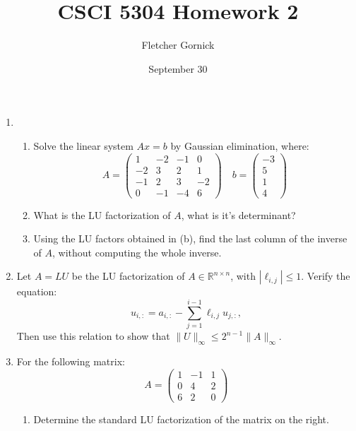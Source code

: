 \documentclass[11pt]{article}
\title{\vspace{-1.0cm}CSCI 5304 Homework 2 }
\author{Fletcher Gornick}
\date{September 30}
\newcommand{\R}{\mathbb{R}}
\begin{document}
\maketitle
\begin{enumerate}
	\item \begin{enumerate}
		      \item Solve the linear system \(Ax = b\) by Gaussian elimination, where:
		            \[A =
			            \begin{pmatrix}
				            1  & -2 & -1 & 0  \\
				            -2 & 3  & 2  & 1  \\
				            -1 & 2  & 3  & -2 \\
				            0  & -1 & -4 & 6
			            \end{pmatrix}
			            \quad b = \begin{pmatrix} -3 \\ 5 \\ 1 \\ 4 \end{pmatrix}
		            \]

		      \item What is the LU factorization of \(A\), what is it's determinant?

		      \item Using the LU factors obtained in (b), find the last column of the inverse of \(A\), without computing the whole inverse.
	      \end{enumerate}

	\item Let \(A = LU\) be the LU factorization of \(A \in \R^{n \times n}\), with \(|\ell_{i,j}| \leq 1\).  Verify the equation:
	      \[u_{i,:} = a_{i,:} - \sum_{j=1}^{i-1} \ell_{i,j}u_{j,:},\]
	      Then use this relation to show that \(\lVert U \rVert_\infty \leq 2^{n-1} \lVert A \rVert_\infty\).

	\item For the following matrix:
	      \[A =
		      \begin{pmatrix}
			      1 & -1 & 1 \\
			      0 & 4  & 2 \\
			      6 & 2  & 0
		      \end{pmatrix}
	      \]
	      \begin{enumerate}
		      \item Determine the standard LU factorization of the matrix on the right.


\end{enumerate}
\end{enumerate}
\end{document}
